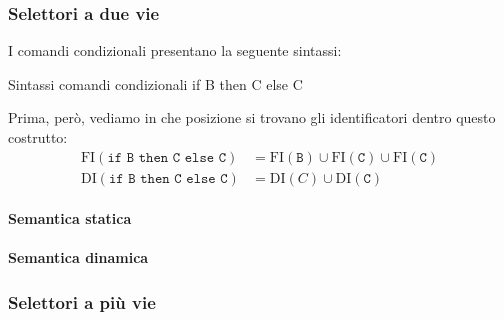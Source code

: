\subsubsection{Selettori a due vie}
I comandi condizionali presentano la seguente sintassi:
\begin{bnfcode}{Sintassi comandi condizionali}
    if B then C else C
\end{bnfcode}

Prima, però, vediamo in che posizione si trovano gli identificatori dentro questo costrutto:
\[
    \begin{aligned}
        \mathrm{FI}(\texttt{if B then C else C}) &= \mathrm{FI}(\texttt{B}) \cup \mathrm{FI}(\texttt{C}) \cup \mathrm{FI}(\texttt{C})\\
        \mathrm{DI}(\texttt{if B then C else C}) &= \mathrm{DI}(C) \cup \mathrm{DI}(\texttt{C})
    \end{aligned}
\]

\paragraph{Semantica statica}

\paragraph{Semantica dinamica}

\subsubsection{Selettori a più vie}